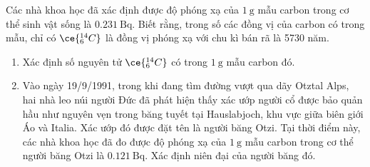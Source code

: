 \begin{ex}
Các nhà khoa học đã xác định được độ phóng xạ của $\SI{1}{\gram}$ mẫu carbon trong cơ thể sinh vật sống là $\SI{0.231}{\becquerel}$. Biết rằng, trong số các đồng vị của carbon có trong mẫu, chỉ có $\ce{_6^{14}C}$ là đồng vị phóng xạ với chu kì bán rã là 5730 năm.	
\begin{enumerate}[label=\alph*)]
	\item Xác định số nguyên tử $\ce{_6^{14}C}$ có trong $\SI{1}{\gram}$ mẫu carbon đó.
	\item Vào ngày 19/9/1991, trong khi đang tìm đường vượt qua dãy Otztal Alps, hai nhà leo núi người Đức đã phát hiện thấy xác ướp người cổ được bảo quản hầu như nguyên vẹn trong băng tuyết tại Hauslabjoch, khu vực giữa biên giới Áo và Italia. Xác ướp đó được đặt tên là người băng Otzi. Tại thời điểm này, các nhà khoa học đã đo được độ phóng xạ của $
	\SI{1}{\gram}$ mẫu carbon trong cơ thể người băng Otzi là $\SI{0.121}{\becquerel}$. Xác định niên đại của người băng đó.
\end{enumerate}
\end{ex}

